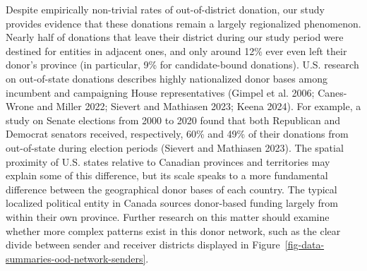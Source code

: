 \documentclass[
  letterpaper,
  DIV=11,
  numbers=noendperiod]{scrartcl}
\begin{document}
Despite empirically non-trivial rates of out-of-district donation, our
study provides evidence that these donations remain a largely
regionalized phenomenon. Nearly half of donations that leave their
district during our study period were destined for entities in adjacent
ones, and only around 12\% ever even left their donor's province (in
particular, 9\% for candidate-bound donations). U.S. research on
out-of-state donations describes highly nationalized donor bases among
incumbent and campaigning House representatives (Gimpel et al. 2006;
Canes-Wrone and Miller 2022; Sievert and Mathiasen 2023; Keena 2024).
For example, a study on Senate elections from 2000 to 2020 found that
both Republican and Democrat senators received, respectively, 60\% and
49\% of their donations from out-of-state during election periods
(Sievert and Mathiasen 2023). The spatial proximity of U.S. states
relative to Canadian provinces and territories may explain some of this
difference, but its scale speaks to a more fundamental difference
between the geographical donor bases of each country. The typical
localized political entity in Canada sources donor-based funding largely
from within their own province. Further research on this matter should
examine whether more complex patterns exist in this donor network, such
as the clear divide between sender and receiver districts displayed in
Figure~\ref{fig-data-summaries-ood-network-senders}.
\end{document}
